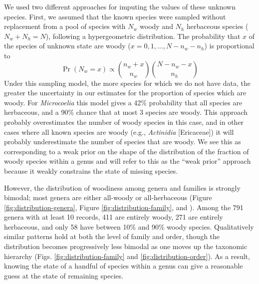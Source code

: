 We used two different approaches for imputing the values of these
unknown species. First, we assumed that the known species were sampled
without replacement from a pool of species with $N_w$ woody and $N_h$
herbaceous species ($N_w + N_h = N$), following a hypergeometric
distribution. The probability that $x$ of the species of unknown state
are woody ($x = 0, 1, \ldots, N - n_w - n_h$) is proportional to
\begin{equation}
  \Pr(N_w = x) \propto {n_w + x \choose n_w}
  {N - n_w - x \choose n_h}
\end{equation}
Under this sampling model, the more species for which we do not have data,
the greater the uncertainty in our estimates for the proportion of species
which are woody.
%
For \textit{Microcoelia} this model gives a 42\% probability that all
species are herbaceous, and a 90\% chance that at most 3 species
are woody.
This approach probably overestimates the number of woody species in
this case, and in other cases where all known species are woody (e.g.,
\textit{Actinidia} [Ericaceae]) it will probably underestimate the
number of species that are woody. We see this as corresponding to a
weak prior on the shape of the distribution of the fraction of woody
species within a genus and will refer to this as the ``weak prior''
approach because it weakly constrains the state of missing species.

However, the distribution of woodiness among genera and families is
strongly bimodal; most genera are either all-woody or all-herbaceous
(Figure \ref{fig:distribution-genera}, Figure \ref{fig:distribution-family}, and 
\citealt{sinnott1915evolution}).  Among the 791 genera with at least 10
records, 411 are entirely woody, 271 are entirely herbaceous, and only
58 have between 10\% and 90\% woody species. Qualitatively similar patterns
hold at both the level of family and order, though the distribution
becomes progressively less bimodal as one moves up the taxonomic hierarchy 
(Figs. \ref{fig:distribution-family} and \ref{fig:distribution-order}). 
As a result, knowing the state of a handful of species within a genus 
can give a reasonable guess at the state of remaining species.

